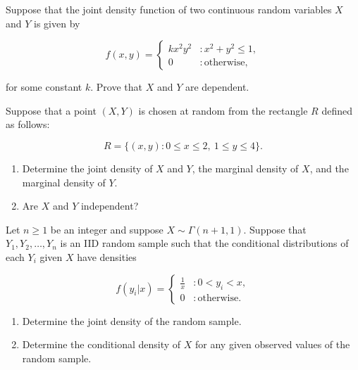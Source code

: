 \documentclass[12pt,reqno]{amsart}
\begin{document}
\bigskip
\prob Suppose that the joint density function of two continuous random variables $X$ and $Y$ is given by

	\[f(x,y) = \begin{cases}
	k x^2y^2 & : x^2+y^2 \leq 1, \\
	0 & : \text{otherwise},
	\end{cases}
	\]
	
for some constant $k$. Prove that $X$ and $Y$ are dependent.\vfill














\bigskip
\prob Suppose that a point $(X, Y )$ is chosen at random from the rectangle $R$ defined as follows:

	\[R=\{(x,y) : 0\leq x \leq 2, \ 1\leq y\leq 4\}.
	\]

\medskip
\begin{enumerate}
\item Determine the joint density of $X$ and $Y$, the marginal density of $X$, and the marginal density of $Y$.\vfill




\item Are $X$ and $Y$ independent?\vfill


\end{enumerate}






\newpage
\prob Let $n\geq 1$ be an integer and suppose $X\sim \Gamma(n+1,1)$. Suppose that $Y_1,Y_2,\ldots,Y_n$ is an IID random sample such that the conditional distributions of each $Y_i$ given $X$ have densities

	\[f(y_i|x) = \begin{cases}
	\frac{1}{x} & : 0 < y_i < x, \\
	0 & : \text{otherwise}.
	\end{cases}
	\]
	
\medskip
\begin{enumerate}
\item Determine the joint density of the random sample.\vfill



\item Determine the conditional density of $X$ for any given observed values of the random sample.\vfill



\end{enumerate}
\end{document}
